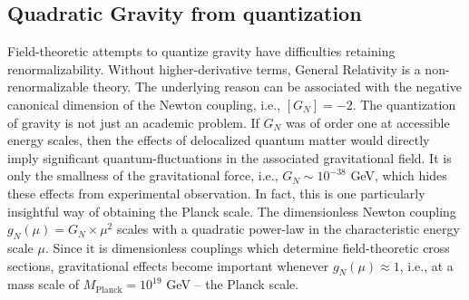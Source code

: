 \documentclass[a4paper,oneside,openany,11pt]{memoir}
\numberwithin{equation}{section} %
\begin{document}
\subsection{Quadratic Gravity from quantization}

Field-theoretic attempts to quantize gravity have difficulties retaining renormalizability. Without higher-derivative terms, General Relativity is a non-renormalizable theory. The underlying reason can be associated with the negative canonical dimension of the Newton coupling, i.e., $[G_N]=-2$. The quantization of gravity is not just an academic problem. If $G_N$ was of order one at accessible energy scales, then the effects of delocalized quantum matter would directly imply significant quantum-fluctuations in the associated gravitational field. It is only the smallness of the gravitational force, i.e., $G_N\sim 10^{-38}$ GeV, which hides these effects from experimental observation. In fact, this is one particularly insightful way of obtaining the Planck scale. The dimensionless Newton coupling $g_N(\mu) = G_N\times \mu^2$ scales with a quadratic power-law in the characteristic energy scale $\mu$. Since it is dimensionless couplings which determine field-theoretic cross sections, gravitational effects become important whenever $g_N(\mu)\approx 1$, i.e., at a mass scale of $M_\text{Planck} = 10^{19}$ GeV -- the Planck scale.
\end{document}
